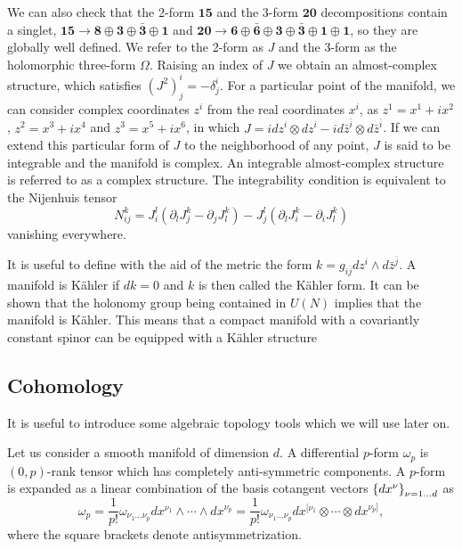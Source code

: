 We can also check that the 2-form $\mathbf {15}$ and the 3-form $\mathbf{20}$ decompositions contain a singlet, 
$\mathbf {15}\to \mathbf 8\oplus \mathbf 3\oplus \bar {\mathbf 3}\oplus \mathbf 1$ and 
$\mathbf {20}\to \mathbf 6\oplus \bar{\mathbf 6}\oplus\mathbf 3\oplus \bar {\mathbf 3}\oplus \mathbf 1\oplus \mathbf 1$,
so they are globally well defined.
We refer to the 2-form as $J$ and the 3-form as the holomorphic three-form $\Omega$.
Raising an index of $J$ we obtain an almost-complex structure, which satisfies $(J^2)^i_j=-\delta^i_j$.
For a particular point of the manifold, we can consider  complex coordinates $z^i$ from the real coordinates $x^i$,
as $z^1=x^1+ix^2$, $z^2=x^3+ix^4$ and $z^3=x^5+ix^6$,
in which $J=idz^i\otimes dz^i - i d\bar z^{\bar i}\otimes d\bar z^{\bar i}$.
If we can extend this particular form of $J$ to the neighborhood of any point, $J$ is said to be integrable
and the manifold is complex.
An integrable almost-complex structure is referred to as a complex structure. 
The integrability condition is equivalent to the Nijenhuis tensor 
\begin{equation}
  N^k_{ij}= J^l_i(\partial_l J^k_j - \partial_j J^k_l) - J_j^l (\partial_l J^k_i - \partial_i J^k_l)
\end{equation}
vanishing everywhere.

It is useful to define with the aid of the metric the form $k=g_{i\bar j} dz^i \wedge d\bar z^{\bar j}$.
A manifold is Kähler if $dk=0$ and $k$ is then called the Kähler form.
It can be shown that the holonomy group being contained in $U(N)$ implies that the manifold is Kähler.
This means that a compact manifold with a covariantly constant spinor can be equipped with a Kähler structure

\subsection{Cohomology}

It is useful to introduce some algebraic topology tools which we will use later on.

Let us consider a smooth manifold of dimension $d$. A differential $p$-form $\omega_p$ is $(0,p)$-rank tensor which has completely anti-symmetric components.
A $p$-form is expanded as a linear combination of the basis cotangent vectors $\qty{dx^\nu}_{\nu=1\ldots d}$  as
\begin{equation}
  \omega_p =\frac{1}{p!} \omega_{\nu_1\ldots\nu_p}dx^{\nu_1}\wedge \cdots  \wedge dx^{\nu_p} =
\frac{1}{p!} \omega_{\nu_1\ldots\nu_p}dx^{[ \nu_1}\otimes \cdots  \otimes dx^{\nu_p]},
\end{equation}
where the square brackets denote antisymmetrization.

